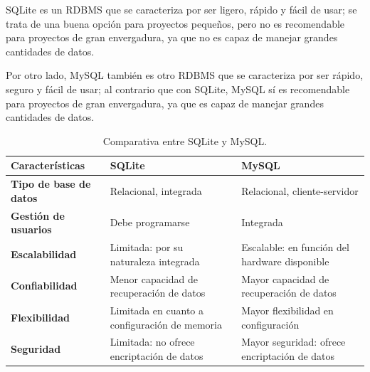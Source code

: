                 SQLite es un RDBMS \cite{sqlite} que se caracteriza por ser ligero, rápido y fácil de usar; se trata de una buena opción para proyectos pequeños, pero no es recomendable para proyectos de gran envergadura, ya que no es capaz de manejar grandes cantidades de datos.
                
                Por otro lado, MySQL también es otro RDBMS \cite{mysql} que se caracteriza por ser rápido, seguro y fácil de usar; al contrario que con SQLite, MySQL sí es recomendable para proyectos de gran envergadura, ya que es capaz de manejar grandes cantidades de datos.

                \begin{table}[h]
                    \centering
                    
                    \begin{tabular}{|>{\centering\arraybackslash}m{4cm}|>{\centering\arraybackslash}m{5cm}|>{\centering\arraybackslash}m{5cm}|}
                        \hline
                        \textbf{Características} & \textbf{SQLite} & \textbf{MySQL} \\
                        \hline
                        \hline
                        \textbf{Tipo de base de datos} & Relacional, integrada & Relacional, cliente-servidor \\
                        \hline
                        \textbf{Gestión de usuarios} & Debe programarse & Integrada \\
                        \hline
                        \textbf{Escalabilidad} & Limitada: por su naturaleza integrada & Escalable: en función del hardware disponible \\
                        \hline
                        \textbf{Confiabilidad} & Menor capacidad de recuperación de datos & Mayor capacidad de recuperación de datos \\
                        \hline
                        \textbf{Flexibilidad} & Limitada en cuanto a configuración de memoria & Mayor flexibilidad en configuración \\
                        \hline
                        \textbf{Seguridad} & Limitada: no ofrece encriptación de datos & Mayor seguridad: ofrece encriptación de datos \\
                        \hline
                    \end{tabular}
                        
                    \caption{Comparativa entre SQLite y MySQL.}
                    \label{tabla:mysql-vs-sqlite}
                \end{table}

